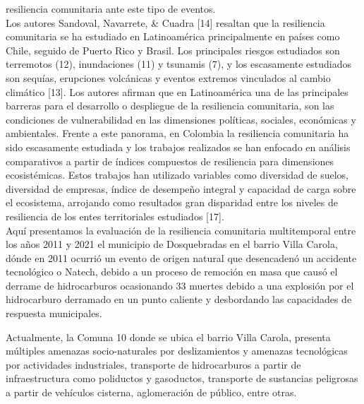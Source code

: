 \documentclass[
  letterpaper,
]{book}
\begin{document}
resiliencia comunitaria ante este tipo de eventos.\\
Los autores Sandoval, Navarrete, \& Cuadra {[}14{]} resaltan que la
resiliencia comunitaria se ha estudiado en Latinoamérica principalmente
en países como Chile, seguido de Puerto Rico y Brasil. Los principales
riesgos estudiados son terremotos (12), inundaciones (11) y tsunamis
(7), y los escasamente estudiados son sequías, erupciones volcánicas y
eventos extremos vinculados al cambio climático {[}13{]}. Los autores
afirman que en Latinoamérica una de las principales barreras para el
desarrollo o despliegue de la resiliencia comunitaria, son las
condiciones de vulnerabilidad en las dimensiones políticas, sociales,
económicas y ambientales. Frente a este panorama, en Colombia la
resiliencia comunitaria ha sido escasamente estudiada y los trabajos
realizados se han enfocado en análisis comparativos a partir de índices
compuestos de resiliencia para dimensiones ecosistémicas. Estos trabajos
han utilizado variables como diversidad de suelos, diversidad de
empresas, índice de desempeño integral y capacidad de carga sobre el
ecosistema, arrojando como resultados gran disparidad entre los niveles
de resiliencia de los entes territoriales estudiados {[}17{]}.\\
Aquí presentamos la evaluación de la resiliencia comunitaria
multitemporal entre los años 2011 y 2021 el municipio de Dosquebradas en
el barrio Villa Carola, dónde en 2011 ocurrió un evento de origen
natural que desencadenó un accidente tecnológico o Natech, debido a un
proceso de remoción en masa que causó el derrame de hidrocarburos
ocasionando 33 muertes debido a una explosión por el hidrocarburo
derramado en un punto caliente y desbordando las capacidades de
respuesta municipales.

Actualmente, la Comuna 10 donde se ubica el barrio Villa Carola,
presenta múltiples amenazas socio-naturales por deslizamientos y
amenazas tecnológicas por actividades industriales, transporte de
hidrocarburos a partir de infraestructura como poliductos y gasoductos,
transporte de sustancias peligrosas a partir de vehículos cisterna,
aglomeración de público, entre otras.
\end{document}
